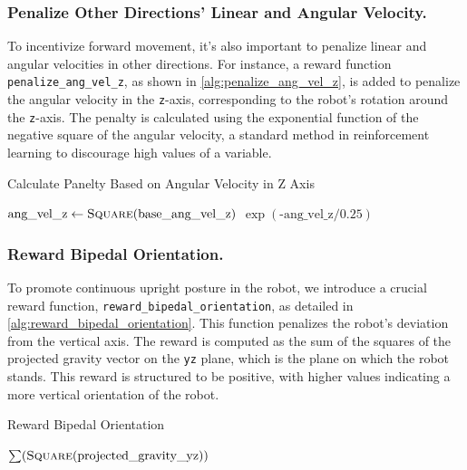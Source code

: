 \documentclass{article} %
\begin{document}
\subsubsection{Penalize Other Directions' Linear and Angular Velocity.}

To incentivize forward movement, it's also important to penalize linear and angular velocities in other directions. For instance, a reward function \texttt{penalize\_ang\_vel\_z}, as shown in \autoref{alg:penalize_ang_vel_z}, is added to penalize the angular velocity in the \texttt{z}-axis, corresponding to the robot's rotation around the \texttt{z}-axis. The penalty is calculated using the exponential function of the negative square of the angular velocity, a standard method in reinforcement learning to discourage high values of a variable.

\begin{algorithm}[H]
   \caption{Calculate Panelty Based on Angular Velocity in Z Axis}
   \label{alg:penalize_ang_vel_z}
   \begin{algorithmic}
       \State $\text{ang\_vel\_z} \gets \Call{Square}{\text{base\_ang\_vel\_z}}$
       \State \Return $\exp(\text{-ang\_vel\_z} / 0.25)$
   \EndFunction
   \end{algorithmic}
\end{algorithm}

\subsubsection{Reward Bipedal Orientation.}


To promote continuous upright posture in the robot, we introduce a crucial reward function, \texttt{reward\_bipedal\_orientation}, as detailed in \autoref{alg:reward_bipedal_orientation}. This function penalizes the robot's deviation from the vertical axis. The reward is computed as the sum of the squares of the projected gravity vector on the \texttt{yz} plane, which is the plane on which the robot stands. This reward is structured to be positive, with higher values indicating a more vertical orientation of the robot.

\begin{algorithm}[H]
   \caption{Reward Bipedal Orientation}
   \label{alg:reward_bipedal_orientation}
   \begin{algorithmic}
       \State \Return $\sum (\Call{Square}{\text{projected\_gravity\_yz}})$ 
   \EndFunction
   \end{algorithmic}
\end{algorithm}
\end{document}
